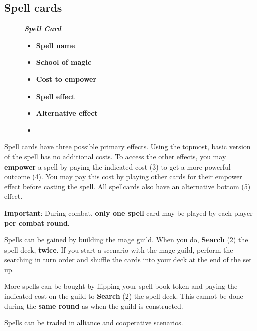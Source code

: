 \subsection*{\hypertarget{spells}{Spell cards}}
\begin{wrapfigure}{R}{0.50\textwidth}
    \begin{center}
  \begin{minipage}[t][5cm][t]{0.50\textwidth}
    \centering
    \vspace{0pt}
    \footnotesize{\textbf{\textit{\textcolor{darkcandyapplered}{Spell Card}}}}
    \scriptsize
    \begin{multicols}{2}
    \begin{itemize}[itemsep=5pt]
        \item[\textbf{1.}] \textbf{Spell name}
        \item[\textbf{2.}] \textbf{School of magic}
        \item[\textbf{3.}] \textbf{Cost to empower}
        \item[\textbf{4.}] \textbf{Spell effect}
        \item[\textbf{5.}] \textbf{Alternative effect}
        \item[]
    \end{itemize}
\end{multicols}
\end{minipage}\hfill
    \end{center}
\end{wrapfigure}


Spell cards have three possible primary effects.
Using the topmost, basic version of the spell has no additional costs.
To access the other effects, you may \textbf{empower} a spell by paying the indicated cost (3) to get a more powerful outcome (4).
You may pay this cost by playing other cards for their empower  effect before casting the spell.
All spellcards also have an alternative bottom (5)  effect.\par

\textbf{Important}: During combat, \textbf{only one spell} card may be played by each player \textbf{per combat round}.\par
Spells can be gained by building the mage guild.
When you do, \textbf{Search} (2) the spell deck, \textbf{twice}.
If you start a scenario with the mage guild, perform the searching in turn order and shuffle the cards into your deck at the end of the set up.\par
More spells can be bought by flipping your spell book token and paying the indicated cost on the guild to \textbf{Search} (2) the spell deck.
This cannot be done during the \textbf{same round} as when the guild is constructed.\par
Spells can be \hyperlink{Trading}{traded} in alliance and cooperative scenarios.

